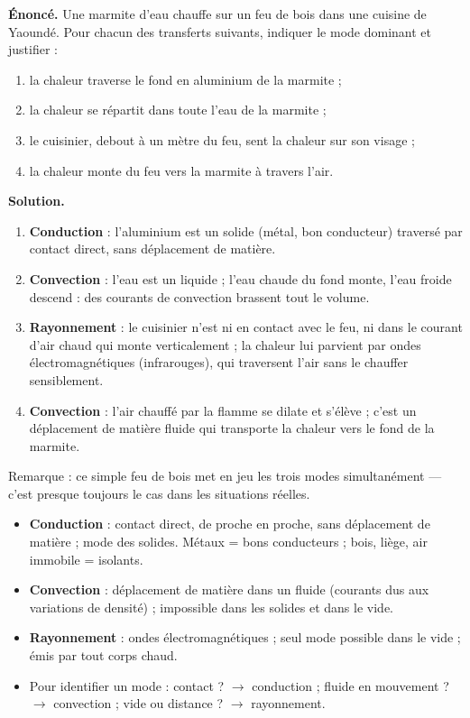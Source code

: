\documentclass[11pt]{article}
\begin{document}
\begin{exoresolu}
\textbf{Énoncé.} Une marmite d'eau chauffe sur un feu de bois dans une cuisine de Yaoundé. Pour chacun des transferts suivants, indiquer le mode dominant et justifier :
\begin{enumerate}
\item la chaleur traverse le fond en aluminium de la marmite ;
\item la chaleur se répartit dans toute l'eau de la marmite ;
\item le cuisinier, debout à un mètre du feu, sent la chaleur sur son visage ;
\item la chaleur monte du feu vers la marmite à travers l'air.
\end{enumerate}
\tcblower
\textbf{Solution.}
\begin{enumerate}
\item \textbf{Conduction} : l'aluminium est un solide (métal, bon conducteur) traversé par contact direct, sans déplacement de matière.
\item \textbf{Convection} : l'eau est un liquide ; l'eau chaude du fond monte, l'eau froide descend : des courants de convection brassent tout le volume.
\item \textbf{Rayonnement} : le cuisinier n'est ni en contact avec le feu, ni dans le courant d'air chaud qui monte verticalement ; la chaleur lui parvient par ondes électromagnétiques (infrarouges), qui traversent l'air sans le chauffer sensiblement.
\item \textbf{Convection} : l'air chauffé par la flamme se dilate et s'élève ; c'est un déplacement de matière fluide qui transporte la chaleur vers le fond de la marmite.
\end{enumerate}
Remarque : ce simple feu de bois met en jeu les trois modes simultanément — c'est presque toujours le cas dans les situations réelles.
\end{exoresolu}

\begin{aretenir}
\begin{itemize}
\item \textbf{Conduction} : contact direct, de proche en proche, sans déplacement de matière ; mode des solides. Métaux = bons conducteurs ; bois, liège, air immobile = isolants.
\item \textbf{Convection} : déplacement de matière dans un fluide (courants dus aux variations de densité) ; impossible dans les solides et dans le vide.
\item \textbf{Rayonnement} : ondes électromagnétiques ; seul mode possible dans le vide ; émis par tout corps chaud.
\item Pour identifier un mode : contact ? $\rightarrow$ conduction ; fluide en mouvement ? $\rightarrow$ convection ; vide ou distance ? $\rightarrow$ rayonnement.
\end{itemize}
\end{aretenir}
\end{document}
